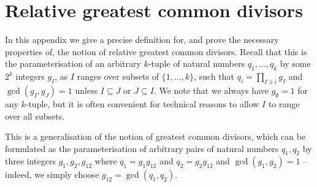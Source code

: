 \documentclass[11pt,letterpaper]{amsart}
\newcommand{\ogcd}[2]{\gcd(#1,#2)}
\theoremstyle{definition}
\begin{document}

\appendix
\section{Relative greatest common divisors}\label{app1}
In this appendix we give a precise definition for, and prove the necessary properties of, the notion of relative greatest common divisors. Recall that this is the parameterisation of an arbitrary $k$-tuple of natural numbers $q_1,\ldots,q_k$ by some $2^k$ integers $g_I$, as $I$ ranges over subsets of $\{1,\ldots,k\}$, such that $q_i=\prod_{I\ni i}g_I$ and $\ogcd{g_I}{g_J}=1$ unless $I\subseteq J$ or $J\subseteq I$. We note that we always have $g_\emptyset=1$ for any $k$-tuple, but it is often convenient for technical reasons to allow $I$ to range over all subsets.

This is a generalisation of the notion of greatest common divisors, which can be formulated as the parameterisation of arbitrary pairs of natural numbers $q_1,q_2$ by three integers $g_1,g_2,g_{12}$ where $q_1=g_1g_{12}$ and $q_2=g_2g_{12}$ and $\ogcd{g_1}{g_2}=1$ -- indeed, we simply choose $g_{12}=\ogcd{q_1}{q_2}$. 
\end{document}

